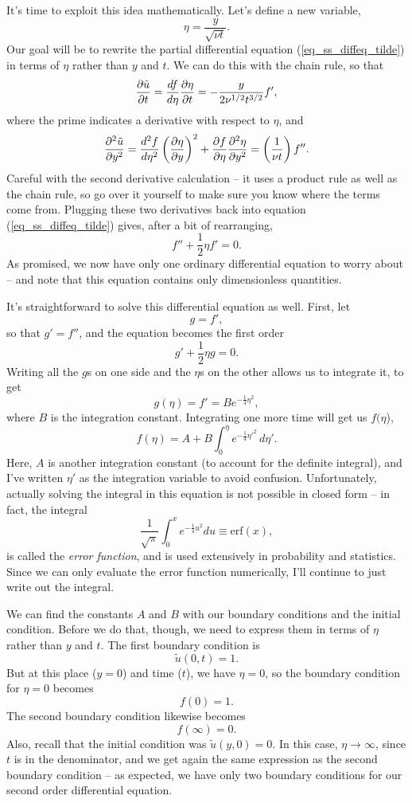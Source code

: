 It's time to exploit this idea mathematically.  Let's define a new variable,
\begin{equation}
\eta = \frac{y}{\sqrt{\nu t}}.
\end{equation}
Our goal will be to rewrite the partial differential equation (\ref{eq_ss_diffeq_tilde}) in terms of $\eta$ rather than $y$ and $t$.  We can do this with the chain rule, so that
\[
\frac{\partial {\tilde{u}}}{\partial {t}} = \frac{df}{d\eta} \frac{\partial {\eta}}{\partial {t}} = -\frac{y}{2 \nu^{1/2} t^{3/2}} f',
\]
where the prime indicates a derivative with respect to $\eta$, and
\[
\frac{\partial^2 {\tilde{u}}}{\partial {y}^2} = \frac{d^2 f}{d\eta^2} \left( \frac{\partial {\eta}}{\partial {y}} \right)^2 + \frac{\partial {f}}{\partial {\eta}} \frac{\partial^2 {\eta}}{\partial {y}^2} = \left( \frac{1}{\nu t} \right) f''.
\]
Careful with the second derivative calculation -- it uses a product rule as well as the chain rule, so go over it yourself to make sure you know where the terms come from.  Plugging these two derivatives back into equation (\ref{eq_ss_diffeq_tilde}) gives, after a bit of rearranging,
\begin{equation}
f'' + \frac{1}{2} \eta f' = 0.
\end{equation}
As promised, we now have only one ordinary differential equation to worry about -- and note that this equation contains only dimensionless quantities.

It's straightforward to solve this differential equation as well.  First, let
\[
g = f',
\]
so that $g' = f''$, and the equation becomes the first order
\[
g' + \frac{1}{2} \eta g = 0.
\]
Writing all the $g$s on one side and the $\eta$s on the other allows us to integrate it, to get
\[
g(\eta) = f' = B e^{-\tfrac{1}{4} \eta^2},
\]
where $B$ is the integration constant.  Integrating one more time will get us $f(\eta$),
\[
f(\eta) = A + B \int_0^\eta e^{-\tfrac{1}{4} \eta'^2} \, d\eta'.
\]
Here, $A$ is another integration constant (to account for the definite integral), and I've written $\eta'$ as the integration variable to avoid confusion.  Unfortunately, actually solving the integral in this equation is not possible in closed form -- in fact, the integral
\[
\frac{1}{\sqrt{\pi}} \int_0^x e^{-\tfrac{1}{4} u^2} du \equiv \text{erf}(x),
\]
is called the \emph{error function}, and is used extensively in probability and statistics.  Since we can only evaluate the error function numerically, I'll continue to just write out the integral.

We can find the constants $A$ and $B$ with our boundary conditions and the initial condition.  Before we do that, though, we need to express them in terms of $\eta$ rather than $y$ and $t$.  The first boundary condition is
\[
\tilde{u}(0, t) = 1.
\]
But at this place ($y=0$) and time ($t$), we have $\eta = 0$,  so the boundary condition for $\eta=0$ becomes
\[
f(0) = 1.
\]
The second boundary condition likewise becomes
\[
f(\infty) = 0.
\]
Also, recall that the initial condition was $\tilde{u}(y, 0) = 0$.  In this case, $\eta \to \infty$, since $t$ is in the denominator, and we get again the same expression as the second boundary condition -- as expected, we have only two boundary conditions for our second order differential equation.

